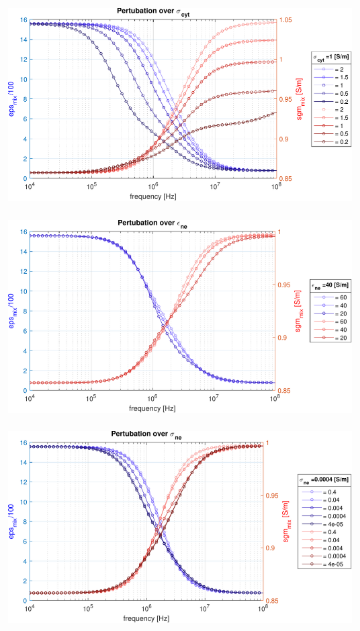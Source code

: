 \begin{figure}[t!]
\begin{subfigure}{0.5\linewidth}
	\caption{}
	\label{fig:epscytpert}
\end{subfigure}\hfill
\begin{subfigure}{0.5\linewidth}
	\centering
	\includegraphics[width=0.95\linewidth]{../code/figs/sgm_cyt_pert}
	\caption{}
	\label{fig:sgmcytpert}
\end{subfigure}\vspace{0.6cm}
	\begin{subfigure}{0.5\linewidth}
	\centering
	\includegraphics[width=0.95\linewidth]{../code/figs/eps_ne_pert}
	\caption{}
	\label{fig:epsnepert}
\end{subfigure}\hfill
\begin{subfigure}{0.5\linewidth}
	\centering
	\includegraphics[width=0.95\linewidth]{../code/figs/sgm_ne_pert}

\end{subfigure}
\end{figure}
